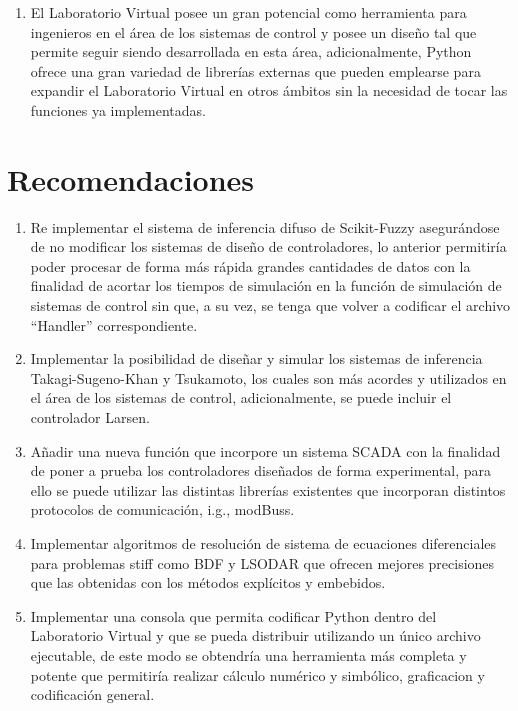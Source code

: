 \begin{enumerate}[leftmargin=15pt]
        \item El Laboratorio Virtual posee un gran potencial como herramienta para ingenieros en el área de los sistemas de control y posee un diseño tal que permite seguir siendo desarrollada en esta área, adicionalmente, Python ofrece una gran variedad de librerías externas que pueden emplearse para expandir el Laboratorio Virtual en otros ámbitos sin la necesidad de tocar las funciones ya implementadas.
    \end{enumerate}

\section{Recomendaciones}

\begin{enumerate}[leftmargin=15pt]
    \setlength\itemsep{10pt}    
    \item Re implementar el sistema de inferencia difuso de Scikit-Fuzzy asegurándose de no modificar los sistemas de diseño de controladores, lo anterior permitiría poder procesar de forma más rápida grandes cantidades de datos con la finalidad de acortar los tiempos de simulación en la función de simulación de sistemas de control sin que, a su vez, se tenga que volver a codificar el archivo \enquote{Handler} correspondiente.
    
    \item Implementar la posibilidad de diseñar y simular los sistemas de inferencia Takagi-Sugeno-Khan y Tsukamoto, los cuales son más acordes y utilizados en el área de los sistemas de control, adicionalmente, se puede incluir el controlador Larsen.
    
    \item Añadir una nueva función que incorpore un sistema SCADA con la finalidad de poner a prueba los controladores diseñados de forma experimental, para ello se puede utilizar las distintas librerías existentes que incorporan distintos protocolos de comunicación, i.g., modBuss.
    
    \item Implementar algoritmos de resolución de sistema de ecuaciones diferenciales para problemas stiff como BDF y LSODAR que ofrecen mejores precisiones que las obtenidas con los métodos explícitos y embebidos.
    
    \item Implementar una consola que permita codificar Python dentro del Laboratorio Virtual y que se pueda distribuir utilizando un único archivo ejecutable, de este modo se obtendría una herramienta más completa y potente que permitiría realizar cálculo numérico y simbólico, graficacion y codificación general.  

\end{enumerate}